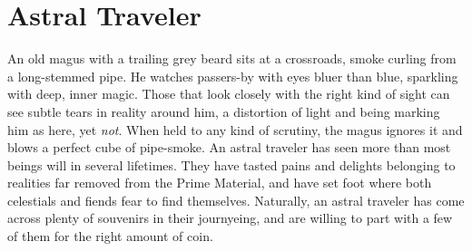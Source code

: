 \documentclass[10pt,a4paper,twoside,twocolumn,openany,nodeprecatedcode,bg=print]{dndbook}
\begin{document}
\section{Astral Traveler}
An old magus with a trailing grey beard sits at a crossroads, smoke curling from a long-stemmed pipe. He watches passers-by with eyes bluer than blue, sparkling with deep, inner magic. Those that look closely with the right kind of sight can see subtle tears in reality around him, a distortion of light and being marking him as here, yet \textit{not}. When held to any kind of scrutiny, the magus ignores it and blows a perfect cube of pipe-smoke.
An astral traveler has seen more than most beings will in several lifetimes. They have tasted pains and delights belonging to realities far removed from the Prime Material, and have set foot where both celestials and fiends fear to find themselves. Naturally, an astral traveler has come across plenty of souvenirs in their journyeing, and are willing to part with a few of them for the right amount of coin.
\end{document}
